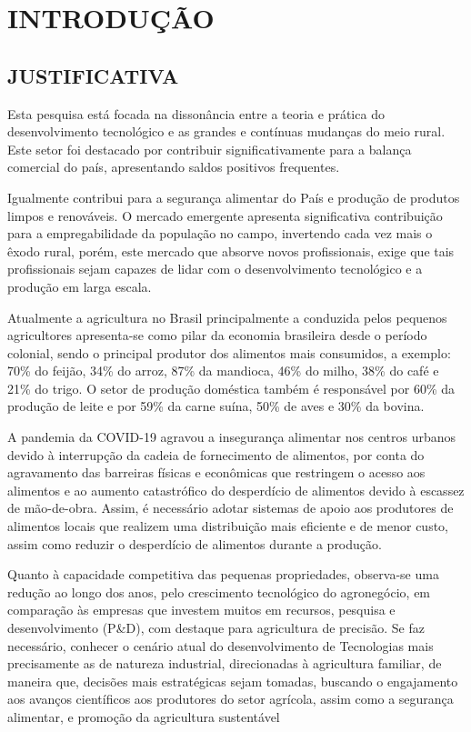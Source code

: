 \chapter{INTRODUÇÃO}



\section{JUSTIFICATIVA}

Esta pesquisa está focada na dissonância entre a teoria e prática do desenvolvimento tecnológico e as grandes e contínuas mudanças do meio rural. Este setor foi destacado por contribuir significativamente para a balança comercial do país, apresentando saldos positivos frequentes. 

Igualmente contribui para a segurança alimentar do País e produção de produtos limpos e renováveis. O mercado emergente apresenta significativa contribuição para a empregabilidade da população no campo, invertendo cada vez mais o êxodo rural, porém, este mercado que absorve novos profissionais, exige que tais profissionais sejam capazes de lidar com o desenvolvimento tecnológico e a produção em larga escala. 

Atualmente a agricultura no Brasil principalmente a conduzida pelos pequenos agricultores apresenta-se como pilar da economia brasileira desde o período colonial, sendo o principal produtor dos alimentos mais consumidos, a exemplo: 70\% do feijão, 34\% do arroz, 87\% da mandioca, 46\% do milho, 38\% do café e 21\% do trigo. O setor de produção doméstica também é responsável por 60\% da produção de leite e por 59\% da carne suína, 50\% de aves e 30\% da bovina. 

A pandemia da COVID-19 agravou a insegurança alimentar nos centros urbanos devido à interrupção da cadeia de fornecimento de alimentos, por conta do agravamento das barreiras físicas e econômicas que restringem o acesso aos alimentos e ao aumento catastrófico do desperdício de alimentos devido à escassez de mão-de-obra. Assim, é necessário adotar sistemas de apoio aos produtores de alimentos locais que realizem uma distribuição mais eficiente e de menor custo, assim como reduzir o desperdício de alimentos durante a produção. 

Quanto à capacidade competitiva das pequenas propriedades, observa-se uma redução ao longo dos anos, pelo crescimento tecnológico do agronegócio, em comparação às empresas que investem muitos em recursos, pesquisa e desenvolvimento (P\&D), com destaque para agricultura de precisão. Se faz necessário, conhecer o cenário atual do desenvolvimento de Tecnologias  mais precisamente as de natureza industrial, direcionadas à agricultura familiar, de maneira que, decisões mais estratégicas sejam tomadas, buscando o engajamento aos avanços científicos aos produtores do setor agrícola, assim como a segurança alimentar, e promoção da agricultura sustentável

